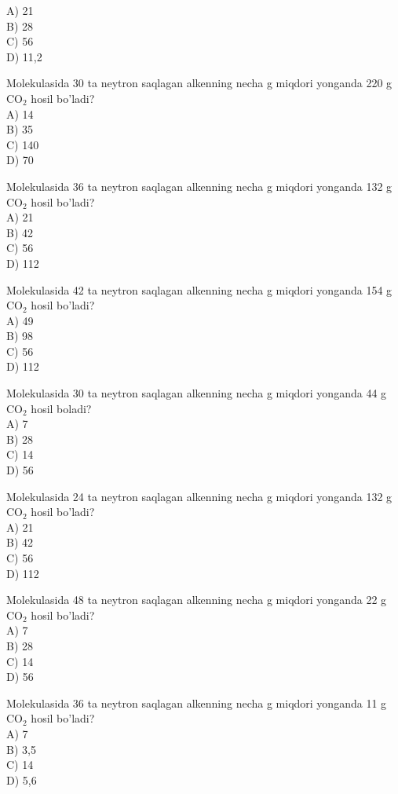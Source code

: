 A) 21\\
B) 28\\
C) 56\\
D) 11,2
  \item Molekulasida 30 ta neytron saqlagan alkenning necha g miqdori yonganda 220 g $\mathrm{CO}_{2}$ hosil bo'ladi?\\
A) 14\\
B) 35\\
C) 140\\
D) 70
  \item Molekulasida 36 ta neytron saqlagan alkenning necha g miqdori yonganda 132 g $\mathrm{CO}_{2}$ hosil bo'ladi?\\
A) 21\\
B) 42\\
C) 56\\
D) 112
  \item Molekulasida 42 ta neytron saqlagan alkenning necha g miqdori yonganda 154 g $\mathrm{CO}_{2}$ hosil bo'ladi?\\
A) 49\\
B) 98\\
C) 56\\
D) 112
  \item Molekulasida 30 ta neytron saqlagan alkenning necha g miqdori yonganda 44 g $\mathrm{CO}_{2}$ hosil boladi?\\
A) 7\\
B) 28\\
C) 14\\
D) 56
  \item Molekulasida 24 ta neytron saqlagan alkenning necha g miqdori yonganda 132 g $\mathrm{CO}_{2}$ hosil bo'ladi?\\
A) 21\\
B) 42\\
C) 56\\
D) 112
  \item Molekulasida 48 ta neytron saqlagan alkenning necha g miqdori yonganda 22 g $\mathrm{CO}_{2}$ hosil bo'ladi?\\
A) 7\\
B) 28\\
C) 14\\
D) 56
  \item Molekulasida 36 ta neytron saqlagan alkenning necha g miqdori yonganda 11 g $\mathrm{CO}_{2}$ hosil bo'ladi?\\
A) 7\\
B) 3,5\\
C) 14\\
D) 5,6
